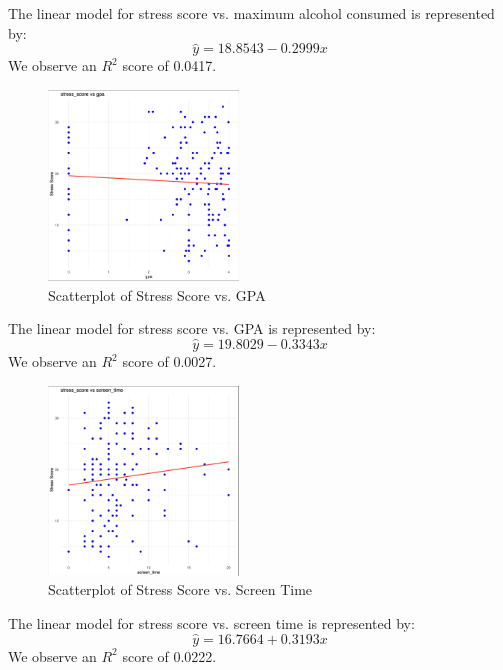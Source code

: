 \documentclass{article}
\theoremstyle{mytheoremstyle}
\theoremstyle{mytheoremstyle}
\theoremstyle{myproblemstyle}
\begin{document}
    The linear model for stress score vs. maximum alcohol consumed is represented by:
    \[\hat{y} = 18.8543 -0.2999x\]
    We observe an \(R^2\) score of 0.0417.  
    \vspace{0.1in}
    \begin{figure}[H]
    \begin{center}
      \includegraphics[width=0.45\textwidth]{figures/stress_vs_gpa.png}
    \end{center}
    \caption{Scatterplot of Stress Score vs. GPA}\label{fig:}
  \end{figure}
  
  The linear model for stress score vs. GPA is represented by:
  \[\hat{y} = 19.8029 -0.3343x\]
  We observe an \(R^2\) score of 0.0027. 
  \vspace{0.1in}
  \begin{figure}[H]
    \begin{center}
      \includegraphics[width=0.45\textwidth]{figures/stress_vs_screentime.png}
    \end{center}
    \caption{Scatterplot of Stress Score vs. Screen Time}\label{fig:}
  \end{figure}

  The linear model for stress score vs. screen time is represented by:
  \[\hat{y} = 16.7664 + 0.3193x\]
  We observe an \(R^2\) score of 0.0222. 
  \vspace{0.25in}
\end{document}
